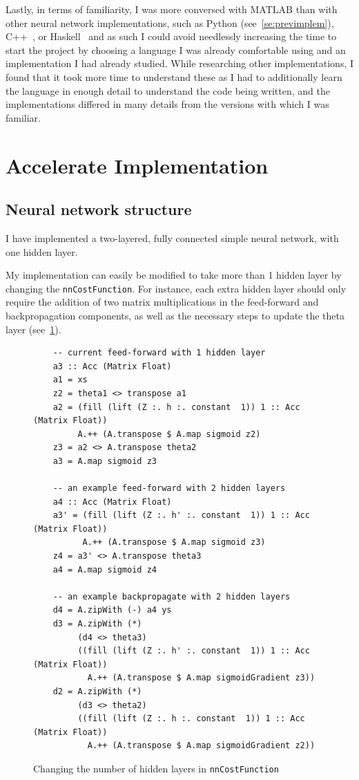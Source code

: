 Lastly, in terms of familiarity, I was more conversed with MATLAB than with other neural network implementations, such as Python (see~\ref{se:previmplem}), C++~\cite{Wol17}, or Haskell~\cite{Bru16} and as such I could avoid needlessly increasing the time to start the project by choosing a language I was already comfortable using and an implementation I had already studied. While researching other implementations, I found that it took more time to understand these as I had to additionally learn the language in enough detail to understand the code being written, and the implementations differed in many details from the versions with which I was familiar.

\section{Accelerate Implementation} \label{se:impl.acc}

\subsection{Neural network structure} \label{se:impl.nn.struct}

I have implemented a two-layered, fully connected simple neural network, with one hidden layer.

My implementation can easily be modified to take more than 1 hidden layer by changing the \texttt{nnCostFunction}. For instance, each extra hidden layer should only require the addition of two matrix multiplications in the feed-forward and backpropagation components, as well as the necessary steps to update the theta layer (see~\ref{fig:nnCostFunction.hiddenlayers}).

\begin{figure}
  \begin{lstlisting}
    -- current feed-forward with 1 hidden layer
    a3 :: Acc (Matrix Float)
    a1 = xs 
    z2 = theta1 <> transpose a1 
    a2 = (fill (lift (Z :. h :. constant  1)) 1 :: Acc (Matrix Float)) 
         A.++ (A.transpose $ A.map sigmoid z2) 
    z3 = a2 <> A.transpose theta2 
    a3 = A.map sigmoid z3
    
    -- an example feed-forward with 2 hidden layers
    a4 :: Acc (Matrix Float)
    a3' = (fill (lift (Z :. h' :. constant  1)) 1 :: Acc (Matrix Float))
          A.++ (A.transpose $ A.map sigmoid z3)
    z4 = a3' <> A.transpose theta3
    a4 = A.map sigmoid z4
    
    -- an example backpropagate with 2 hidden layers
    d4 = A.zipWith (-) a4 ys
    d3 = A.zipWith (*) 
         (d4 <> theta3)
         ((fill (lift (Z :. h' :. constant  1)) 1 :: Acc (Matrix Float)) 
           A.++ (A.transpose $ A.map sigmoidGradient z3)) 
    d2 = A.zipWith (*) 
         (d3 <> theta2)
         ((fill (lift (Z :. h :. constant  1)) 1 :: Acc (Matrix Float)) 
           A.++ (A.transpose $ A.map sigmoidGradient z2)) 
  \end{lstlisting}
  \caption{Changing the number of hidden layers in \texttt{nnCostFunction}}
  \label{fig:nnCostFunction.hiddenlayers}
\end{figure}


